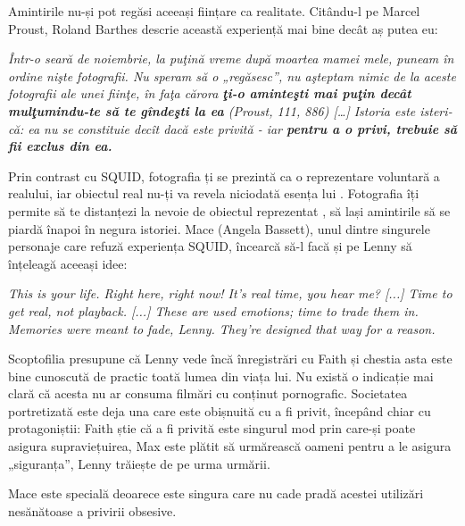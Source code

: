 \documentclass[12pt]{article}
\begin{document}
Amintirile nu-și pot regăsi aceeași ființare ca realitate. Citându-l pe Marcel Proust, Roland Barthes descrie această experiență mai bine decât aș putea eu:

\begin{displayquote}
		\textit{Într-o seară de noiembrie, la puţină vreme după moartea mamei mele, puneam în ordine nişte fotografii. Nu speram să o „regăsesc”, nu aşteptam nimic de la \guillemetleft aceste fotografii ale unei fiinţe, în faţa cărora \textbf{ţi-o aminteşti mai puţin decât mulţumindu-te să te gîndeşti la ea}\guillemetright\: (Proust, 111, 886) […] Istoria este isteri­că: ea nu se constituie decît dacă este privită - iar \textbf{pentru a o privi, trebuie să fii exclus din ea.}}
\end{displayquote}

Prin contrast cu SQUID, fotografia ți se prezintă ca o reprezentare voluntară a realului, iar obiectul real nu-ți va revela niciodată esența lui \cite{BarthesCameraluminoasa2009a}. Fotografia îți permite să te distanțezi la nevoie de obiectul reprezentat \cite{secSontagPlatosCavea}, să lași amintirile să se piardă înapoi în negura istoriei. Mace (Angela Bassett), unul dintre singurele personaje care refuză experiența SQUID, încearcă să-l facă și pe Lenny să înțeleagă aceeași idee:\par

\begin{displayquote}
	\textit{This is your life. Right here, right now! It’s real time, you hear me? [...] Time to get real, not playback. [...] These are used emotions; time to trade them in. Memories were meant to fade, Lenny. They’re designed that way for a reason.}
\end{displayquote}

Scoptofilia presupune că Lenny vede încă înregistrări cu Faith și chestia asta este bine cunoscută de practic toată lumea din viața lui. Nu există o indicație mai clară că acesta nu ar consuma filmări cu conținut pornografic. Societatea portretizată este deja una care este obișnuită cu a fi privit, începând chiar cu protagoniștii: Faith știe că a fi privită este singurul mod prin care-și poate asigura supraviețuirea, Max este plătit să urmărească oameni pentru a le asigura „siguranța”, Lenny trăiește de pe urma urmării.\par

Mace este specială deoarece este singura care nu cade pradă acestei utilizări nesănătoase a privirii obsesive.
\printbibliography
\end{document}
